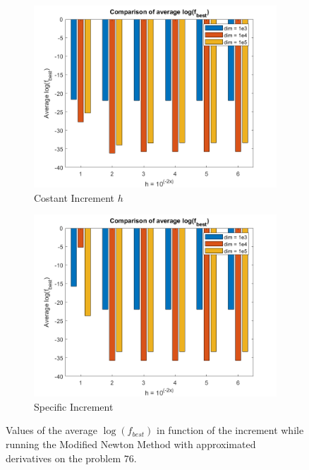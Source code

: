 \begin{figure}[htbp]
    \centering
    \begin{subfigure}[t]{0.45\textwidth}  %
        \centering
        \includegraphics[width=\textwidth]{img/pb76_MN_difffinite_COST_log(fbest).png}
        \caption{Costant Increment $h$}
    \end{subfigure}
    \hspace{1cm} %
    \begin{subfigure}[t]{0.45\textwidth}
        \centering
        \includegraphics[width=\textwidth]{img/pb76_MN_difffinite_REL_log(fbest).png}
        \caption{Specific Increment }
    \end{subfigure}
    \caption{ \small Values of the average $\log(f_{best})$ in function of the increment while running the Modified Newton Method with approximated derivatives on the problem $76$.}
    \label{logfbest_difffinite}
\end{figure}

